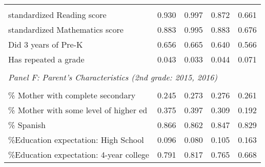 {\begin{tabular}{lcccc}
            &            &            &            &            \\
standardized Reading score&       0.930&       0.997&       0.872&       0.661\\
standardized Mathematics score&       0.883&       0.995&       0.883&       0.676\\
Did 3 years of Pre-K&       0.656&       0.665&       0.640&       0.566\\
Has repeated a grade&       0.043&       0.033&       0.044&       0.071\\
&  &  &   \\
\multicolumn{4}{l}{\textit{Panel F: Parent's Characteristics (2nd grade: 2015, 2016)}} \\
            &            &            &            &            \\
\% Mother with complete secondary&       0.245&       0.273&       0.276&       0.261\\
\% Mother with some level of higher ed&       0.375&       0.397&       0.309&       0.192\\
\% Spanish  &       0.866&       0.862&       0.847&       0.829\\
\%Education expectation: High School&       0.096&       0.080&       0.105&       0.163\\
\%Education expectation: 4-year college&       0.791&       0.817&       0.765&       0.668\\

\bottomrule
\end{tabular}
}

